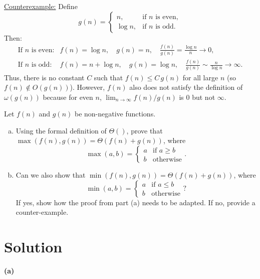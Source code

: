 \documentclass[11pt]{article}
\begin{document}
    \underline{Counterexample:} Define
    \[
    g(n)=
    \begin{cases}
    n, & \text{if \(n\) is even},\\[1mm]
    \log n, & \text{if \(n\) is odd}.
    \end{cases}
    \]
    Then:
    \[
    \begin{array}{rcl}
    \text{If } n \text{ is even:} & f(n)=\log n,\quad g(n)=n,\quad \frac{f(n)}{g(n)}=\frac{\log n}{n}\to 0,\\[1mm]
    \text{If } n \text{ is odd:} & f(n)= n+\log n,\quad g(n)=\log n,\quad \frac{f(n)}{g(n)}\sim \frac{n}{\log n}\to \infty.
    \end{array}
    \]
    Thus, there is no constant \(C\) such that \(f(n)\le C\,g(n)\) for all large \(n\) (so \(f(n)\notin O(g(n))\)). However, \(f(n)\) also does not satisfy the definition of \(\omega(g(n))\) because for even \(n\), \( \lim_{n\to\infty} f(n)/g(n)\) is 0 but not \(\infty\). 
    
    \newpage
    \begin{tcolorbox}[title={Problem 3 (20 pts)}]
    Let $f(n)$ and $g(n)$ be non-negative functions. \begin{enumerate}[(a)]
        \item Using the formal definition of $\Theta()$, prove that $\max(f(n),g(n))=\Theta(f(n)+g(n))$, where \[\max(a, b)=\begin{cases}
        a &\text{if } a\geq b\\
        b &\text{otherwise}
    \end{cases}.\]
        \item Can we also show that $\min(f(n),g(n))=\Theta(f(n)+g(n))$, where \[\min(a, b)=\begin{cases}
        a &\text{if } a\leq b\\
        b &\text{otherwise}
    \end{cases}?\] If yes, show how the proof from part (a) needs to be adapted. If no, provide a counter-example.
    \end{enumerate}
    
    \end{tcolorbox}
    \section*{Solution}

    \textbf{(a)}
\end{document}
